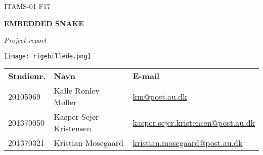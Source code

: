 \pagestyle{empty}
\BgThispage

\vspace*{12em}
\begin{minipage}[l]{\textwidth}
{\small\MakeUppercase{ITAMS-01 F17}}
\end{minipage}

\begin{minipage}[l]{\textwidth}
{\HUGE\bfseries EMBEDDED SNAKE}
\end{minipage}

\begin{minipage}[l]{\textwidth}
{\normalsize\itshape Project report}
\end{minipage}

\vspace{4em}
\begin{minipage}[c]{\textwidth}
\begin{center}
\texttt{[image: rigebillede.png]}
\end{center}
\end{minipage}

\vspace{4em}
\begin{minipage}{\textwidth}
\begin{tabularx}{\textwidth}{@{}p{60px}XX}
\textbf{Studienr.}	&\textbf{Navn}              &\textbf{E-mail}\\
20105969            &Kalle Rønlev Møller        &\href{mailto:km@post.au.dk}{km@post.au.dk}\\
201370050           &Kasper Sejer Kristensen    &\href{mailto:kasper.sejer.kristensen@post.au.dk}{kasper.sejer.kristensen@post.au.dk}\\
201370321           &Kristian Mosegaard	        &\href{mailto:kristian.mosegaard@post.au.dk}{kristian.mosegaard@post.au.dk}
\end{tabularx}
\end{minipage}
